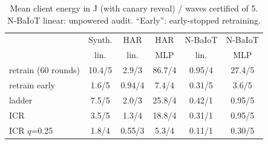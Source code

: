\documentclass[journal]{IEEEtran}
\begin{document}
\begin{table}[t]
\centering
\caption{Mean client energy in J (with canary reveal) / waves certified of 5. N-BaIoT linear: unpowered audit. ``Early'': early-stopped retraining.}\label{tab:icr}
\footnotesize
\setlength{\tabcolsep}{3pt}
\begin{tabular}{@{}lccccc@{}}
\toprule
 & Synth. & HAR & HAR & N-BaIoT & N-BaIoT\\
 & lin. & lin. & MLP & lin. & MLP\\
\midrule
retrain (60 rounds) & 10.4/5 & 2.9/3 & 86.7/4 & 0.95/4 & 27.4/5\\
retrain early & 1.6/5 & 0.94/4 & 7.4/4 & 0.31/5 & 3.6/5\\
ladder & 7.5/5 & 2.0/3 & 25.8/4 & 0.42/1 & 0.95/5\\
ICR & 3.5/5 & 1.3/4 & 18.8/4 & 0.31/1 & 0.95/5\\
ICR $q$=0.25 & 1.8/4 & 0.55/3 & 5.3/4 & 0.11/1 & 0.30/5\\
\bottomrule
\end{tabular}
\end{table}
\end{document}
